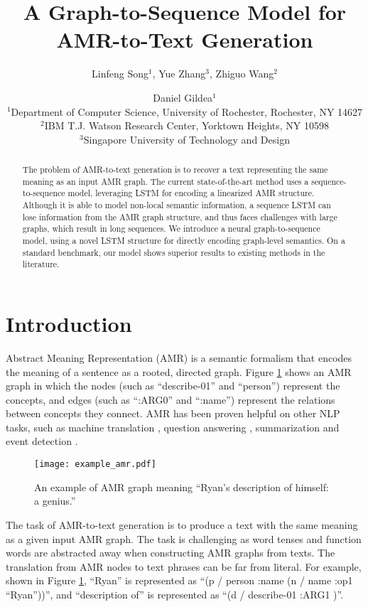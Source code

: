 \documentclass[11pt,a4paper]{article}
\title{A Graph-to-Sequence Model for AMR-to-Text Generation}
\author{Linfeng Song$^1$, Yue Zhang$^3$, Zhiguo Wang$^2$ \and Daniel Gildea$^1$ \\
  $^1$Department of Computer Science, University of Rochester, Rochester, NY 14627 \\
  $^2$IBM T.J. Watson Research Center, Yorktown Heights, NY 10598 \\
  $^3$Singapore University of Technology and Design}
\date{}
\begin{document}
\maketitle
\begin{abstract}
  The problem of AMR-to-text generation is to recover a text representing the same meaning as an input AMR graph.
  The current state-of-the-art method uses a sequence-to-sequence model, leveraging LSTM for encoding a linearized AMR structure. 
  Although it is able to model non-local semantic information, a sequence LSTM can lose information from the AMR graph structure, and thus faces challenges with large graphs, which result in long sequences. 
  We introduce a neural graph-to-sequence model, using a novel LSTM structure for directly encoding graph-level semantics.
  On a standard benchmark, our model shows superior results to existing methods in the literature.
\end{abstract}


\section{Introduction}


Abstract Meaning Representation (AMR) \cite{banarescu-EtAl:2013:LAW7-ID} is a semantic formalism that encodes the meaning of a sentence as a rooted, directed graph.
Figure \ref{fig:example_amr} shows an AMR graph in which the nodes (such as ``describe-01'' and ``person'') represent the concepts, and edges (such as ``:ARG0'' and ``:name'') represent the relations between concepts they connect.
AMR has been proven helpful on other NLP tasks, such as machine translation \cite{jones2012semantics,tamchyna-quirk-galley:2015:S2MT}, question answering \cite{mitra2015addressing}, summarization \cite{takase-EtAl:2016:EMNLP2016} and event detection \cite{li-EtAl:2015:CNewsStory}.


\begin{figure}
\centering
\texttt{[image: example\_amr.pdf]}
\caption{An example of AMR graph meaning ``Ryan's description of himself: a genius.''}
\label{fig:example_amr}
\end{figure}


The task of AMR-to-text generation is to produce a text with the same meaning as a given input AMR graph. 
The task is challenging as word tenses and function words are abstracted away when constructing AMR graphs from texts.
The translation from AMR nodes to text phrases can be far from literal.
For example, shown in Figure \ref{fig:example_amr}, ``Ryan'' is represented as ``(p / person :name (n / name :op1 ``Ryan''))'', and ``description of'' is represented as ``(d / describe-01 :ARG1 )''.
\end{document}
